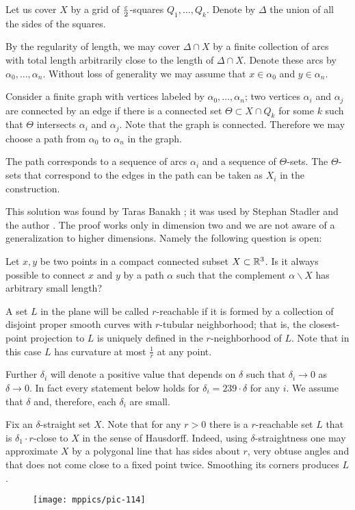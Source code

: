 Let us cover $X$ by a grid of $\tfrac{\varepsilon}2$-squares $Q_1,\dots,Q_k$.
Denote by $\Delta$ the union of all the sides of the squares.

By the regularity of length, we may cover $\Delta\cap X$ by a finite collection of arcs with total length arbitrarily close to the length of $\Delta\cap X$.
Denote these arcs by $\alpha_0,\dots,\alpha_n$.
Without loss of generality we may assume that $x\in\alpha_0$ and $y\in\alpha_n$.

Consider a finite graph with vertices labeled by $\alpha_0,\dots,\alpha_n$;
two vertices $\alpha_i$ and $\alpha_j$ are connected by an edge if there is a connected set $\Theta\subset  X\cap Q_k$ 
for some $k$ such that $\Theta$ intersects $\alpha_i$ and $\alpha_j$.
Note that the graph is connected. Therefore we may choose a path from $\alpha_0$ to $\alpha_n$ in the graph.

The path corresponds to a sequence of arcs $\alpha_i$ and a sequence of $\Theta$-sets.
The $\Theta$-sets that correspond to the edges in the path can be taken as $ X_i$ in the construction.
\qeds

This solution was found by Taras Banakh \cite{banakh};
it was used by Stephan Stadler and the author \cite{petrunin-stadler:revisited}.
The proof works only in dimension two and we are not aware of a generalization to higher dimensions. 
Namely the following question is open:

\begin{pr}
Let $x,y$ be two points in a compact connected subset $X\subset \mathbb{R}^3$. 
Is it always possible to connect $x$ and $y$ by a path $\alpha$ such that the complement $\alpha\backslash X$ has arbitrary small length?
\end{pr}


A set $L$ in the plane will be called $r$-reachable
if it is formed by a collection of disjoint proper smooth curves 
with $r$-tubular neighborhood;
that is, the closest-point projection to $L$ is uniquely defined in the $r$-neighborhood of $L$.
Note that in this case $L$ has curvature at most $\tfrac1r$ at any point.

Further $\delta_i$ will denote a positive value that depends on $\delta$ such that $\delta_i\to0$ as $\delta\to 0$.
In fact every statement below holds for $\delta_i=239\cdot\delta$ for any $i$.
We assume that $\delta$ and, therefore, each $\delta_i$ are small.

Fix an $\delta$-straight set $X$.
Note that for any $r>0$ there is a $r$-reachable set $L$ 
that is $\delta_1\cdot r$-close to $X$ in the sense of Hausdorff.
Indeed, using $\delta$-straightness one may approximate $X$ by a polygonal line that has sides about $r$, very obtuse angles and that does not come close to a fixed point twice.
Smoothing its corners produces $L$.
\begin{figure}[h!]
\centering
\texttt{[image: mppics/pic-114]}
\end{figure}

